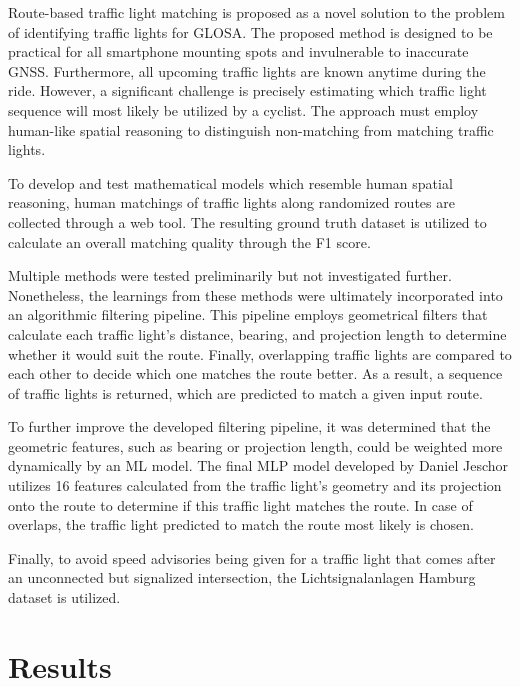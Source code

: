 \begin{Summary}
Route-based traffic light matching is proposed as a novel solution to the problem of identifying traffic lights for GLOSA. The proposed method is designed to be practical for all smartphone mounting spots and invulnerable to inaccurate GNSS. Furthermore, all upcoming traffic lights are known anytime during the ride. However, a significant challenge is precisely estimating which traffic light sequence will most likely be utilized by a cyclist. The approach must employ human-like spatial reasoning to distinguish non-matching from matching traffic lights.

To develop and test mathematical models which resemble human spatial reasoning, human matchings of traffic lights along randomized routes are collected through a web tool. The resulting ground truth dataset is utilized to calculate an overall matching quality through the F1 score.

Multiple methods were tested preliminarily but not investigated further. Nonetheless, the learnings from these methods were ultimately incorporated into an algorithmic filtering pipeline. This pipeline employs geometrical filters that calculate each traffic light's distance, bearing, and projection length to determine whether it would suit the route. Finally, overlapping traffic lights are compared to each other to decide which one matches the route better. As a result, a sequence of traffic lights is returned, which are predicted to match a given input route.

To further improve the developed filtering pipeline, it was determined that the geometric features, such as bearing or projection length, could be weighted more dynamically by an ML model. The final MLP model developed by Daniel Jeschor \cite{jeschor_2022} utilizes 16 features calculated from the traffic light's geometry and its projection onto the route to determine if this traffic light matches the route. In case of overlaps, the traffic light predicted to match the route most likely is chosen.

Finally, to avoid speed advisories being given for a traffic light that comes after an unconnected but signalized intersection, the Lichtsignalanlagen Hamburg dataset is utilized. 
\end{Summary}

\section{Results}

